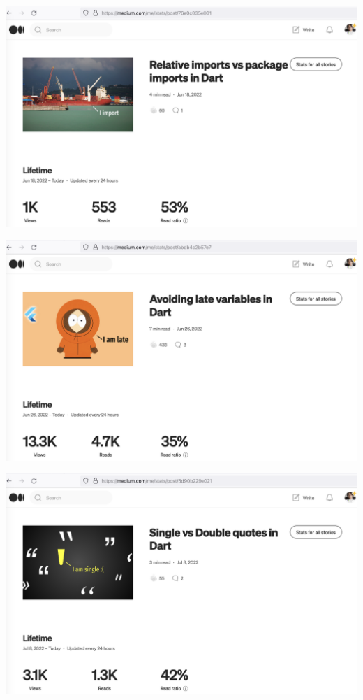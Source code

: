 \begin{center}
    \includegraphics[width=\textwidth]{2022-06-18_import}
\end{center}

\begin{center}
    \includegraphics[width=\textwidth]{2022-06-26_late}
\end{center}

\begin{center}
    \includegraphics[width=\textwidth]{2022-07-08_quotes}
\end{center}

